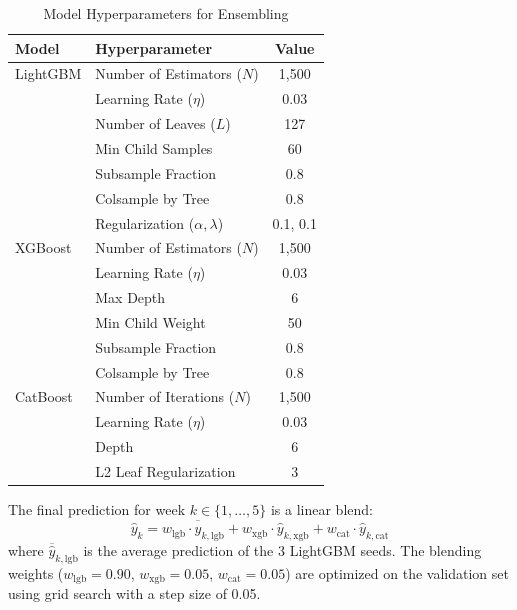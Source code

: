 \documentclass[conference]{IEEEtran}
\begin{document}
\begin{table}[htbp]
\caption{Model Hyperparameters for Ensembling}
\begin{center}
\begin{tabular}{llc}
\toprule
\textbf{Model} & \textbf{Hyperparameter} & \textbf{Value} \\
\midrule
LightGBM & Number of Estimators ($N$) & 1,500 \\
         & Learning Rate ($\eta$) & 0.03 \\
         & Number of Leaves ($L$) & 127 \\
         & Min Child Samples & 60 \\
         & Subsample Fraction & 0.8 \\
         & Colsample by Tree & 0.8 \\
         & Regularization ($\alpha, \lambda$) & 0.1, 0.1 \\
\midrule
XGBoost  & Number of Estimators ($N$) & 1,500 \\
         & Learning Rate ($\eta$) & 0.03 \\
         & Max Depth & 6 \\
         & Min Child Weight & 50 \\
         & Subsample Fraction & 0.8 \\
         & Colsample by Tree & 0.8 \\
\midrule
CatBoost & Number of Iterations ($N$) & 1,500 \\
         & Learning Rate ($\eta$) & 0.03 \\
         & Depth & 6 \\
         & L2 Leaf Regularization & 3 \\
\bottomrule
\end{tabular}
\label{tab:hyperparams}
\end{center}
\end{table}

The final prediction for week $k \in \{1, \dots, 5\}$ is a linear blend:
\begin{equation}
    \hat{y}_{k} = w_{\text{lgb}} \cdot \overline{\hat{y}}_{k, \text{lgb}} + w_{\text{xgb}} \cdot \hat{y}_{k, \text{xgb}} + w_{\text{cat}} \cdot \hat{y}_{k, \text{cat}}
\end{equation}
where $\overline{\hat{y}}_{k, \text{lgb}}$ is the average prediction of the 3 LightGBM seeds. The blending weights ($w_{\text{lgb}} = 0.90$, $w_{\text{xgb}} = 0.05$, $w_{\text{cat}} = 0.05$) are optimized on the validation set using grid search with a step size of 0.05.
\end{document}

